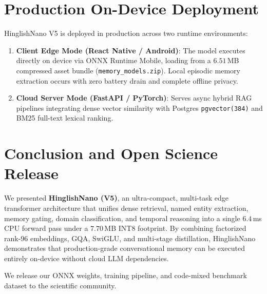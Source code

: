 \documentclass[11pt,a4paper]{article}
\begin{document}
\section{Production On-Device Deployment}

HinglishNano V5 is deployed in production across two runtime environments:
\begin{enumerate}
    \item \textbf{Client Edge Mode (React Native / Android)}: The model executes directly on device via ONNX Runtime Mobile, loading from a $6.51$\,MB compressed asset bundle (\texttt{memory\_models.zip}). Local episodic memory extraction occurs with zero battery drain and complete offline privacy.
    \item \textbf{Cloud Server Mode (FastAPI / PyTorch)}: Serves async hybrid RAG pipelines integrating dense vector similarity with Postgres \texttt{pgvector(384)} and BM25 full-text lexical ranking.
\end{enumerate}

\section{Conclusion and Open Science Release}

We presented \textbf{HinglishNano (V5)}, an ultra-compact, multi-task edge transformer architecture that unifies dense retrieval, named entity extraction, memory gating, domain classification, and temporal reasoning into a single $6.4$\,ms CPU forward pass under a $7.70$\,MB INT8 footprint. By combining factorized rank-96 embeddings, GQA, SwiGLU, and multi-stage distillation, HinglishNano demonstrates that production-grade conversational memory can be executed entirely on-device without cloud LLM dependencies.

We release our ONNX weights, training pipeline, and code-mixed benchmark dataset to the scientific community.
\end{document}

